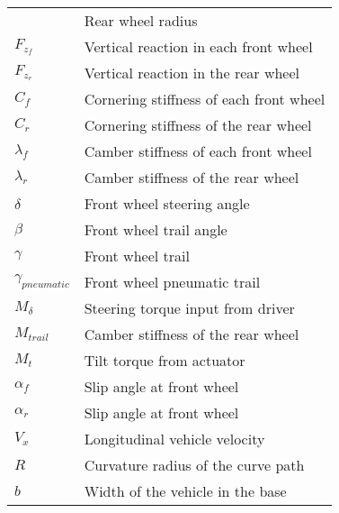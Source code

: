 \begin{longtable}{ll}
{$R_{wr}$ & Rear wheel radius \medskip \\ 
$F_z_f$ & Vertical reaction in each front wheel \medskip \\ 
$F_z_r$ & Vertical reaction in the rear wheel \medskip \\ 
$C_f$ & Cornering stiffness of each front wheel \medskip \\ 
$C_r$ & Cornering stiffness of the rear wheel \medskip \\ 
$\lambda_f$ & Camber stiffness of each front wheel \medskip \\ 
$\lambda_r$ & Camber stiffness of the rear wheel \medskip \\
$\delta$ & Front wheel steering angle \medskip \\ 
$\beta$ & Front wheel trail angle \medskip \\ 
$\gamma$ & Front wheel trail \medskip \\ 
$\gamma_{pneumatic}$ & Front wheel pneumatic trail \medskip \\ 
$M_{\delta}$ & Steering torque input from driver \medskip \\
$M_{trail}$ & Camber stiffness of the rear wheel \medskip \\
$M_{t}$ & Tilt torque from actuator \medskip \\
$\alpha_f$ & Slip angle at front wheel \medskip \\
$\alpha_r$ & Slip angle at front wheel \medskip \\

$V_x$ & Longitudinal vehicle velocity \medskip \\
$R$ & Curvature radius of the curve path \medskip \\
$b$ & Width of the vehicle in the base \medskip \\

\end{longtable}